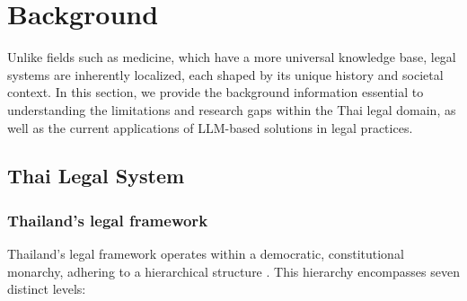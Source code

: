 \section{Background}
\label{sec:background}
Unlike fields such as medicine, which have a more universal knowledge base, legal systems are inherently localized, each shaped by its unique history and societal context.
In this section, we provide the background information essential to understanding the limitations and research gaps within the Thai legal domain, as well as the current applications of LLM-based solutions in legal practices.


\subsection{Thai Legal System}

\subsubsection{Thailand’s legal framework}
\label{sec:legal_system}
Thailand's legal framework operates within a democratic, constitutional monarchy, adhering to a hierarchical structure \cite{basiclaw}. This hierarchy encompasses seven distinct levels:

